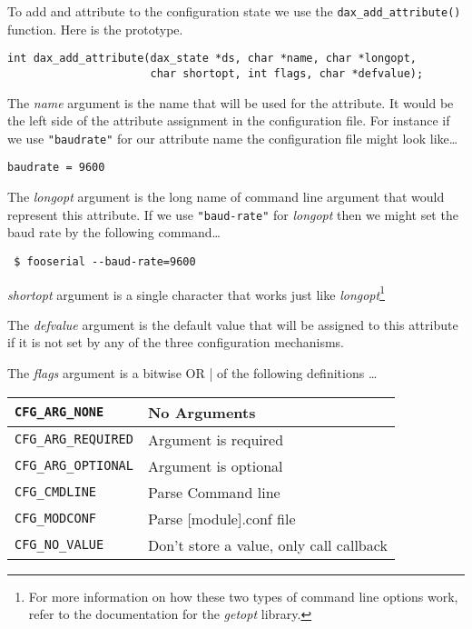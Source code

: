 To add and attribute to the configuration state we use the
\verb|dax_add_attribute()| function.  Here
is the prototype.

\begin{verbatim}
int dax_add_attribute(dax_state *ds, char *name, char *longopt,
                      char shortopt, int flags, char *defvalue);
\end{verbatim}

The \textit{name} argument is the name that will be used for the attribute.  It
would be the left side of the attribute assignment in the configuration file.
For instance if we use \texttt{"baudrate"} for our attribute name the
configuration file might look like\ldots

\begin{verbatim}
baudrate = 9600
\end{verbatim}

The \textit{longopt} argument is the long name of command line argument that
would represent this attribute.  If we use \texttt{"baud-rate"} for
\textit{longopt} then we might set the baud rate by the following command\ldots

\begin{verbatim} $ fooserial --baud-rate=9600 \end{verbatim} %
\textit{shortopt} argument is a single character that works just like
\textit{longopt}\footnote{For more information on how these two types of command
line options work, refer to the documentation for the \textit{getopt} library.}

The \textit{defvalue} argument is the default value that will be assigned to
this attribute if it is not set by any of the three configuration mechanisms.

The \textit{flags} argument is a bitwise OR {|} of the following definitions
\ldots

\begin{tabular}{|l|l|}
\hline \verb|CFG_ARG_NONE| & No Arguments \\
\hline \verb|CFG_ARG_REQUIRED| & Argument is required \\
\hline \verb|CFG_ARG_OPTIONAL| & Argument is optional \\
\hline \verb|CFG_CMDLINE| & Parse Command line \\
\hline \verb|CFG_MODCONF| & Parse [module].conf file \\
\hline \verb|CFG_NO_VALUE| & Don't store a value, only call callback \\
\hline
\end{tabular}

